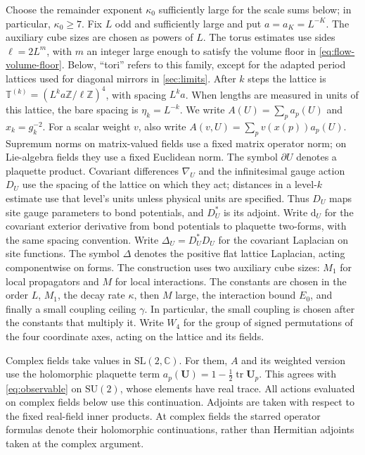 \documentclass[11pt,letterpaper,reqno]{amsart}
\theoremstyle{definition}
\theoremstyle{remark}
\newcommand{\SU}{\mathrm{SU}}
\newcommand{\tr}{\operatorname{tr}}
\begin{document}
Choose the remainder exponent $\kappa_0$ sufficiently large for the
scale sums below; in particular, $\kappa_0\ge7$.
Fix $L$ odd and sufficiently large and put $a=a_K=L^{-K}$. The auxiliary
cube sizes are chosen as powers of $L$. The torus estimates use sides
$\ell=2L^m$, with $m$ an integer large enough to satisfy the volume
floor in \cref{eq:flow-volume-floor}. Below, ``tori'' refers to this
family, except for the adapted period lattices used for diagonal
mirrors in \cref{sec:limits}. After $k$ steps
the lattice is
$\mathbb T^{(k)}=(L^ka\mathbb Z/\ell\mathbb Z)^4$, with spacing $L^ka$.
When lengths are measured in units of this lattice, the bare spacing is
$\eta_k=L^{-k}$. We write
$A(U)=\sum_p a_p(U)$ and $x_k=g_k^{-2}$.
For a scalar weight $v$, also write
$A(v,U)=\sum_p v(x(p))a_p(U)$. Supremum norms on matrix-valued
fields use a fixed matrix operator norm; on Lie-algebra fields they
use a fixed Euclidean norm. The symbol $\partial U$ denotes a
plaquette product. Covariant differences $\nabla_U$ and the
infinitesimal gauge action $D_U$ use the spacing of the lattice on
which they act; distances in a level-$k$ estimate use that level's
units unless physical units are specified. Thus $D_U$ maps site
gauge parameters to bond potentials, and $D_U^*$ is its adjoint.
Write $\mathrm d_U$ for the covariant exterior derivative from bond
potentials to plaquette two-forms, with the same spacing convention.
Write $\Delta_U=D_U^*D_U$ for the covariant Laplacian on site
functions. The symbol $\Delta$ denotes the positive flat lattice
Laplacian, acting componentwise on forms.
The construction uses two auxiliary cube sizes: $M_1$ for local
propagators and $M$ for local interactions. The constants are chosen
in the order $L$, $M_1$, the decay rate $\kappa$, then $M$ large,
the interaction bound $E_0$, and finally a small coupling ceiling
$\gamma$. In particular, the small coupling is chosen after the
constants that multiply it.
Write $W_4$ for the group of signed permutations of the four
coordinate axes, acting on the lattice and its fields.

Complex fields take values in $\mathrm{SL}(2,\mathbb C)$. For them,
$A$ and its weighted version use the holomorphic plaquette term
$a_p(\mathbf U)=1-\tfrac12\tr\mathbf U_p$.
This agrees with \eqref{eq:observable} on $\SU(2)$, whose elements
have real trace. All actions evaluated on complex fields below use
this continuation.
Adjoints are taken with respect to the fixed real-field inner products.
At complex fields the starred operator formulas denote their holomorphic
continuations, rather than Hermitian adjoints taken at the complex
argument.
\end{document}
